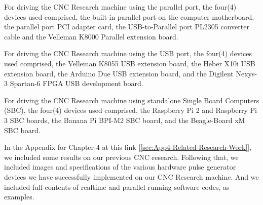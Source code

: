 For driving the CNC Research machine using the parallel port, the four(4) devices used comprised, the built-in parallel port on the computer motherboard, the parallel port PCI adapter card, the USB-to-Parallel port PL2305 converter cable and the Velleman K8000 Parallel extension board.
\vspace*{1\baselineskip}

For driving the CNC Research machine using the USB port, the four(4) devices used comprised, the Velleman K8055 USB extension board, the Heber X10i USB extension board, the Arduino Due USB extension board, and the Digilent Nexys-3 Spartan-6 FPGA USB development board.
\vspace*{1\baselineskip}

For driving the CNC Research machine using standalone Single Board Computers (SBC), the four(4) devices used comprised, the Raspberry Pi 2 and Raspberry Pi 3 SBC boards, the Banana Pi BPI-M2 SBC board, and the Beagle-Board xM SBC board. 
\vspace*{1\baselineskip}

In the Appendix for Chapter-4 at this link [\ref{sec:App4-Related-Research-Work}], we included some results on our previous CNC research. Following that, we included images and specifications of the various hardware pulse generator devices we have successfully implemented on our CNC Research machine. And we included full contents of realtime and parallel running software codes, as examples.



